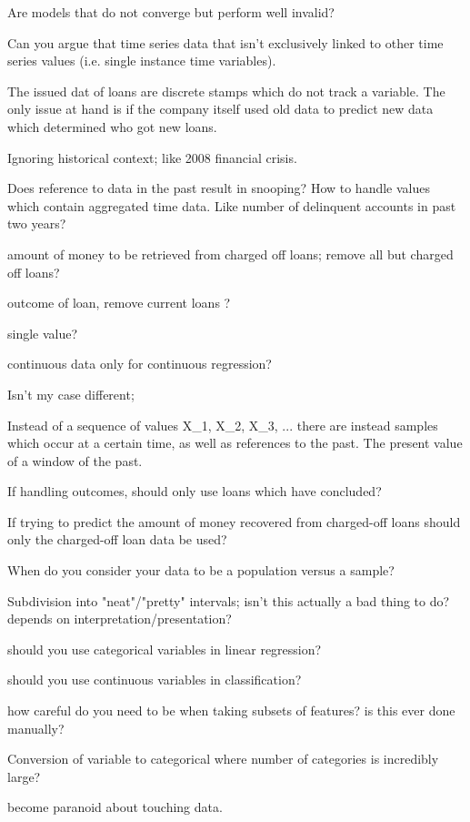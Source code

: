 Are models that do not converge but perform well invalid?

Can you argue that time series data that isn't exclusively linked to other time series values
(i.e. single instance time variables).

The issued dat of loans are discrete stamps which do not track a variable.
The only issue at hand is if the company itself used old data to predict new data which
determined who got new loans.

Ignoring historical context; like 2008 financial crisis.

Does reference to data in the past result in snooping?
How to handle values which contain aggregated time data. Like number of delinquent accounts in
past two years?

amount of money to be retrieved from charged off loans; remove all but
charged off loans?

outcome of loan, remove current loans ?

single value?

continuous data only for continuous regression?

Isn't my case different;

Instead of a sequence of values X_1, X_2, X_3, ...
there are instead samples which occur at a certain time, as well as references to the past.
The present value of a window of the past. 

If handling outcomes, should only use loans which have concluded?

If trying to predict the amount of money recovered from charged-off loans should only the
charged-off loan data be used?

When do you consider your data to be a population versus a sample?

Subdivision into "neat"/"pretty" intervals; isn't this actually a bad thing to do?
depends on interpretation/presentation?

should you use categorical variables in linear regression?

should you use continuous variables in classification?

how careful do you need to be when taking subsets of features?
is this ever done manually? 

Conversion of variable to categorical where number of categories is incredibly large?

become paranoid about touching data.